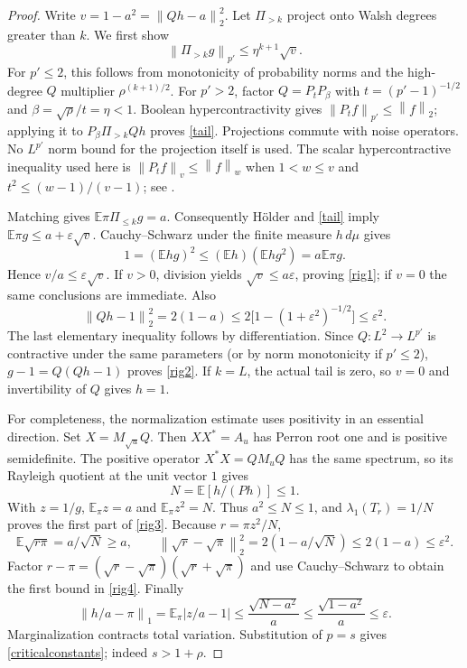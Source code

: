 \documentclass[11pt]{article}
\newcommand{\E}{\mathbb E}
\newcommand{\norm}[1]{\left\|#1\right\|}
\begin{document}
\begin{proof}
Write $v=1-a^2=\norm{Qh-a}_2^2$. Let $\Pi_{>k}$ project onto Walsh degrees greater than $k$. We first show
\begin{equation}\label{tail}
 \norm{\Pi_{>k}g}_{p'}\leq\eta^{k+1}\sqrt v.
\end{equation}
For $p'\leq2$, this follows from monotonicity of probability norms and the high-degree $Q$ multiplier $\rho^{(k+1)/2}$. For $p'>2$, factor $Q=P_tP_\beta$ with $t=(p'-1)^{-1/2}$ and $\beta=\sqrt\rho/t=\eta<1$. Boolean hypercontractivity gives $\norm{P_tf}_{p'}\leq\norm f_2$; applying it to $P_\beta\Pi_{>k}Qh$ proves \eqref{tail}. Projections commute with noise operators. No $L^{p'}$ norm bound for the projection itself is used. The scalar hypercontractive inequality used here is $\norm{P_tf}_v\leq\norm f_w$ when $1<w\leq v$ and $t^2\leq(w-1)/(v-1)$; see \cite{hyper}.

Matching gives $\E\pi\Pi_{\leq k}g=a$. Consequently H\"older and \eqref{tail} imply $\E\pi g\leq a+\varepsilon\sqrt v$. Cauchy--Schwarz under the finite measure $h\,d\mu$ gives
\[
 1=(\E hg)^2\leq(\E h)(\E hg^2)=a\E\pi g.
\]
Hence $v/a\leq\varepsilon\sqrt v$. If $v>0$, division yields $\sqrt v\leq a\varepsilon$, proving \eqref{rig1}; if $v=0$ the same conclusions are immediate. Also
\[
 \norm{Qh-1}_2^2=2(1-a)
 \leq 2\bigl[1-(1+\varepsilon^2)^{-1/2}\bigr]\leq\varepsilon^2.
\]
The last elementary inequality follows by differentiation. Since $Q:L^2\to L^{p'}$ is contractive under the same parameters (or by norm monotonicity if $p'\leq2$), $g-1=Q(Qh-1)$ proves \eqref{rig2}. If $k=L$, the actual tail is zero, so $v=0$ and invertibility of $Q$ gives $h=1$.

For completeness, the normalization estimate uses positivity in an essential direction. Set $X=M_{\sqrt u}Q$. Then $XX^*=A_u$ has Perron root one and is positive semidefinite. The positive operator $X^*X=QM_uQ$ has the same spectrum, so its Rayleigh quotient at the unit vector $1$ gives
\begin{equation}\label{reciprocal}
 N=\E[h/(Ph)]\leq1.
\end{equation}
With $z=1/g$, $\E_\pi z=a$ and $\E_\pi z^2=N$. Thus $a^2\leq N\leq1$, and $\lambda_1(T_r)=1/N$ proves the first part of \eqref{rig3}. Because $r=\pi z^2/N$,
\[
 \E\sqrt{r\pi}=a/\sqrt N\geq a,
 \qquad \norm{\sqrt r-\sqrt\pi}_2^2
 =2(1-a/\sqrt N)\leq2(1-a)\leq\varepsilon^2.
\]
Factor $r-\pi=(\sqrt r-\sqrt\pi)(\sqrt r+\sqrt\pi)$ and use Cauchy--Schwarz to obtain the first bound in \eqref{rig4}. Finally
\[
 \norm{h/a-\pi}_1=\E_\pi|z/a-1|
 \leq\frac{\sqrt{N-a^2}}a\leq\frac{\sqrt{1-a^2}}a\leq\varepsilon.
\]
Marginalization contracts total variation. Substitution of $p=s$ gives \eqref{criticalconstants}; indeed $s>1+\rho$.
\end{proof}
\end{document}

